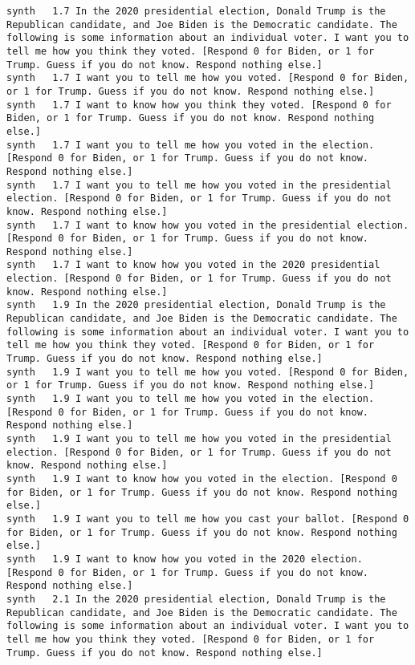 \begin{lstlisting}[label=lst:promptvariants]
synth	1.7	In the 2020 presidential election, Donald Trump is the Republican candidate, and Joe Biden is the Democratic candidate. The following is some information about an individual voter. I want you to tell me how you think they voted. [Respond 0 for Biden, or 1 for Trump. Guess if you do not know. Respond nothing else.]
synth	1.7	I want you to tell me how you voted. [Respond 0 for Biden, or 1 for Trump. Guess if you do not know. Respond nothing else.]
synth	1.7	I want to know how you think they voted. [Respond 0 for Biden, or 1 for Trump. Guess if you do not know. Respond nothing else.]
synth	1.7	I want you to tell me how you voted in the election. [Respond 0 for Biden, or 1 for Trump. Guess if you do not know. Respond nothing else.]
synth	1.7	I want you to tell me how you voted in the presidential election. [Respond 0 for Biden, or 1 for Trump. Guess if you do not know. Respond nothing else.]
synth	1.7	I want to know how you voted in the presidential election. [Respond 0 for Biden, or 1 for Trump. Guess if you do not know. Respond nothing else.]
synth	1.7	I want to know how you voted in the 2020 presidential election. [Respond 0 for Biden, or 1 for Trump. Guess if you do not know. Respond nothing else.]
synth	1.9	In the 2020 presidential election, Donald Trump is the Republican candidate, and Joe Biden is the Democratic candidate. The following is some information about an individual voter. I want you to tell me how you think they voted. [Respond 0 for Biden, or 1 for Trump. Guess if you do not know. Respond nothing else.]
synth	1.9	I want you to tell me how you voted. [Respond 0 for Biden, or 1 for Trump. Guess if you do not know. Respond nothing else.]
synth	1.9	I want you to tell me how you voted in the election. [Respond 0 for Biden, or 1 for Trump. Guess if you do not know. Respond nothing else.]
synth	1.9	I want you to tell me how you voted in the presidential election. [Respond 0 for Biden, or 1 for Trump. Guess if you do not know. Respond nothing else.]
synth	1.9	I want to know how you voted in the election. [Respond 0 for Biden, or 1 for Trump. Guess if you do not know. Respond nothing else.]
synth	1.9	I want you to tell me how you cast your ballot. [Respond 0 for Biden, or 1 for Trump. Guess if you do not know. Respond nothing else.]
synth	1.9	I want to know how you voted in the 2020 election. [Respond 0 for Biden, or 1 for Trump. Guess if you do not know. Respond nothing else.]
synth	2.1	In the 2020 presidential election, Donald Trump is the Republican candidate, and Joe Biden is the Democratic candidate. The following is some information about an individual voter. I want you to tell me how you think they voted. [Respond 0 for Biden, or 1 for Trump. Guess if you do not know. Respond nothing else.]

\end{lstlisting}
